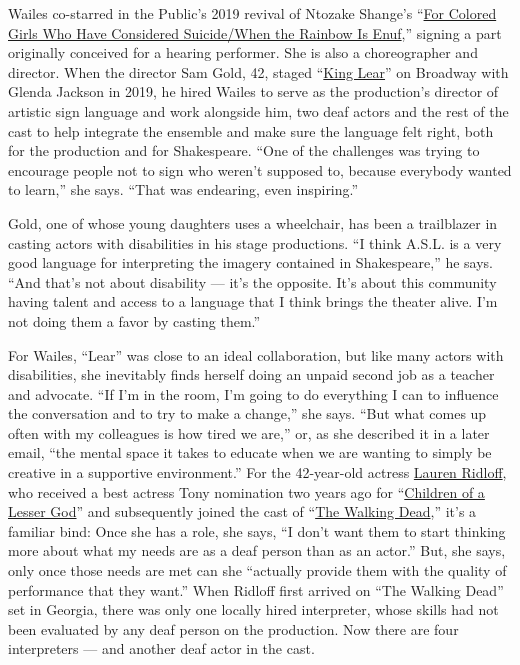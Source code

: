 Wailes co-starred in the Public's 2019 revival of Ntozake Shange's
``\href{https://www.nytimes3xbfgragh.onion/2019/10/22/theater/for-colored-girls-review-ntozake-shange.html}{For
Colored Girls Who Have Considered Suicide/When the Rainbow Is Enuf},''
signing a part originally conceived for a hearing performer. She is also
a choreographer and director. When the director Sam Gold, 42, staged
``\href{https://www.nytimes3xbfgragh.onion/2019/04/04/theater/king-lear-review-glenda-jackson.html}{King
Lear}'' on Broadway with Glenda Jackson in 2019, he hired Wailes to
serve as the production's director of artistic sign language and work
alongside him, two deaf actors and the rest of the cast to help
integrate the ensemble and make sure the language felt right, both for
the production and for Shakespeare. ``One of the challenges was trying
to encourage people not to sign who weren't supposed to, because
everybody wanted to learn,'' she says. ``That was endearing, even
inspiring.''

Gold, one of whose young daughters uses a wheelchair, has been a
trailblazer in casting actors with disabilities in his stage
productions. ``I think A.S.L. is a very good language for interpreting
the imagery contained in Shakespeare,'' he says. ``And that's not about
disability --- it's the opposite. It's about this community having
talent and access to a language that I think brings the theater alive.
I'm not doing them a favor by casting them.''

For Wailes, ``Lear'' was close to an ideal collaboration, but like many
actors with disabilities, she inevitably finds herself doing an unpaid
second job as a teacher and advocate. ``If I'm in the room, I'm going to
do everything I can to influence the conversation and to try to make a
change,'' she says. ``But what comes up often with my colleagues is how
tired we are,'' or, as she described it in a later email, ``the mental
space it takes to educate when we are wanting to simply be creative in a
supportive environment.'' For the 42-year-old actress
\href{https://www.nytimes3xbfgragh.onion/2018/05/11/theater/lauren-ridloff-children-of-a-lesser-god.html}{Lauren
Ridloff}, who received a best actress Tony nomination two years ago for
``\href{https://www.nytimes3xbfgragh.onion/2018/04/11/theater/review-children-of-a-lesser-god-broadway.html}{Children
of a Lesser God}'' and subsequently joined the cast of
``\href{https://www.nytimes3xbfgragh.onion/watching/recommendations/watching-tv-the-walking-dead}{The
Walking Dead},'' it's a familiar bind: Once she has a role, she says,
``I don't want them to start thinking more about what my needs are as a
deaf person than as an actor.'' But, she says, only once those needs are
met can she ``actually provide them with the quality of performance that
they want.'' When Ridloff first arrived on ``The Walking Dead'' set in
Georgia, there was only one locally hired interpreter, whose skills had
not been evaluated by any deaf person on the production. Now there are
four interpreters --- and another deaf actor in the cast.

